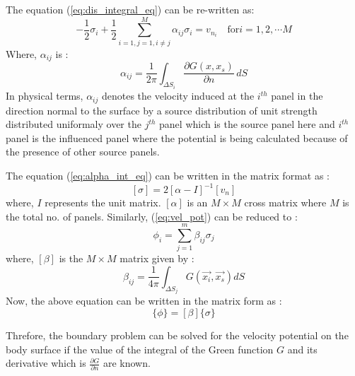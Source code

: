 The equation (\ref{eq:dis_integral_eq}) can be re-written as:
\begin{equation}
    \label{eq:alpha_int_eq}
    -\frac{1}{2}\sigma_i + \frac{1}{2}\sum_{i=1, j=1, i\ne j}^{M}\alpha_{ij}\sigma_i = v_{n_i} \quad \text{for} i = 1, 2, \cdots M
\end{equation}
Where, $\alpha_{ij}$ is : 
\begin{equation}
    \label{eq:alpha}
    \alpha_{ij} = \frac{1}{2\pi}\int_{\Delta S_i}\frac{\partial G(x, x_s)}{\partial n} \,dS
\end{equation}
In physical terms, $\alpha_{ij}$ denotes the velocity induced at the $i^{th}$ panel in the direction normal to the surface by a source distribution of unit strength distributed uniformaly over the $j^{th}$ panel which is the source panel here and $i^{th}$ panel is the influenced panel where the potential is being calculated because of the presence of other source panels.

The equation (\ref{eq:alpha_int_eq}) can be written in the matrix format as :
\begin{equation}
    \label{eq:sigma_alpha}
    [\sigma] = 2[\alpha - I]^{-1}[v_n]
\end{equation}
where, $I$ represents the unit matrix. $[\alpha]$ is an $M\times M$ cross matrix where $M$ is 
the total no. of panels. Similarly, (\ref{eq:vel_pot}) can be reduced to : 
\begin{equation}
    \phi_i = \sum_{j=1}^{m}\beta_{ij}\sigma_{j}
\end{equation}
where, $[\beta]$ is the $M\times M$ matrix given by :
\begin{equation}
    \label{eq:beta_eq}
    \beta_{ij} = \frac{1}{4\pi}\int_{\Delta S_j}G(\Vec{x_i}, \vec{x_s}) dS  
\end{equation}
Now, the above equation can be written in the matrix form as :
\begin{equation}
    \{\phi\} = [\beta]\{\sigma\}
\end{equation}

Threfore, the boundary problem can be solved for the velocity potential on the body surface 
if the value of the integral of the Green function $G$ and its derivative which is
$\frac{\partial G}{\partial n}$ are known.
